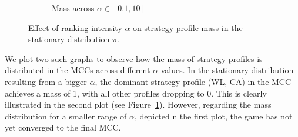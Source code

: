 \begin{flushleft}
\begin{flushleft}
\begin{figure}[H]
\begin{subfigure}[b]{0.49\linewidth}
                \caption{Mass across $\alpha \in [0.1, 10]$}
                \label{fig:alpha_x_pi_10}
            \end{subfigure}
            \caption{Effect of ranking intensity $\alpha$ on strategy profile mass in the stationary distribution $\pi$.}
            \label{fig:alpha_x_pi}
        \end{figure}

        We plot two such graphs to observe how the mass of strategy profiles is distributed in the MCCs across different $\alpha$ values. In the stationary distribution resulting from a bigger $\alpha$, the dominant strategy profile (WL, CA) in the MCC achieves a mass of 1, with all other profiles dropping to 0. This is clearly illustrated in the second plot (see Figure~\ref{fig:alpha_x_pi_10}). However, regarding the mass distribution for a smaller range of $\alpha$, depicted n the first plot, the game has not yet converged to the final MCC.

    \end{flushleft}

\end{flushleft}